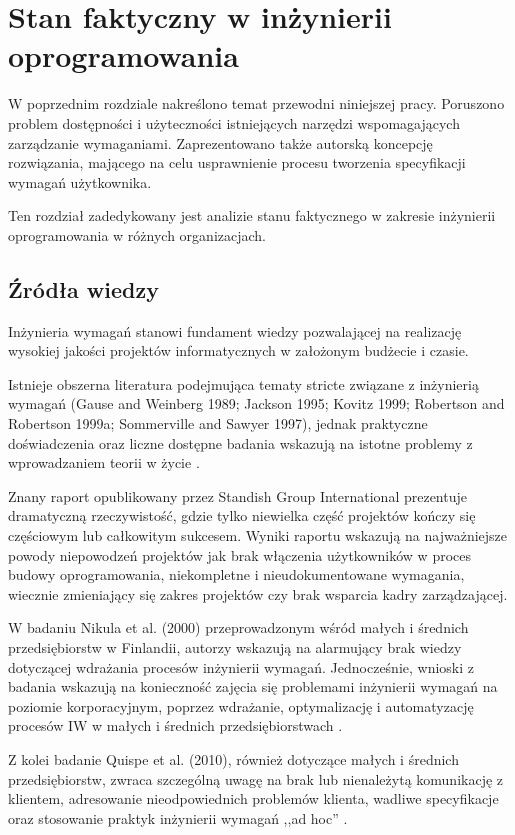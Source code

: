\chapter{Stan faktyczny w inżynierii oprogramowania}

  W poprzednim rozdziale nakreślono temat przewodni niniejszej pracy. Poruszono problem dostępności i użyteczności istniejących narzędzi wspomagających zarządzanie wymaganiami. Zaprezentowano także autorską koncepcję rozwiązania, mającego na celu usprawnienie procesu tworzenia specyfikacji wymagań użytkownika. 

  Ten rozdział zadedykowany jest analizie stanu faktycznego w zakresie inżynierii oprogramowania w różnych organizacjach.  

  \section{Źródła wiedzy}

  Inżynieria wymagań stanowi fundament wiedzy pozwalającej na realizację wysokiej jakości projektów informatycznych w założonym budżecie i czasie. 

  Istnieje obszerna literatura podejmująca tematy stricte związane z inżynierią wymagań (Gause and Weinberg 1989; Jackson 1995; Kovitz 1999; Robertson and Robertson 1999a; Sommerville and Sawyer 1997), jednak praktyczne doświadczenia oraz liczne dostępne badania wskazują na istotne problemy z wprowadzaniem teorii w życie \cite{Boehm06, Niku00, Standish94}.

  Znany raport opublikowany przez Standish Group International \cite{Standish94} prezentuje dramatyczną rzeczywistość, gdzie tylko niewielka część projektów kończy się częściowym lub całkowitym sukcesem. Wyniki raportu wskazują na najważniejsze powody niepowodzeń projektów jak brak włączenia użytkowników w proces budowy oprogramowania, niekompletne i nieudokumentowane wymagania, wiecznie zmieniający się zakres projektów czy brak wsparcia kadry zarządzającej.      
  
  W badaniu Nikula et al. (2000) przeprowadzonym wśród małych i średnich przedsiębiorstw w Finlandii, autorzy wskazują na alarmujący brak wiedzy dotyczącej wdrażania procesów inżynierii wymagań. Jednocześnie, wnioski z badania wskazują na konieczność zajęcia się problemami inżynierii wymagań na poziomie korporacyjnym, poprzez wdrażanie, optymalizację i automatyzację procesów IW w małych i średnich przedsiębiorstwach \cite{Niku00}.
  
  Z kolei badanie Quispe et al. (2010), również dotyczące małych i średnich przedsiębiorstw, zwraca szczególną uwagę na brak lub nienależytą komunikację z klientem, adresowanie nieodpowiednich problemów klienta, wadliwe specyfikacje oraz stosowanie praktyk inżynierii wymagań ,,ad hoc'' \cite{Quispe10}.
  
